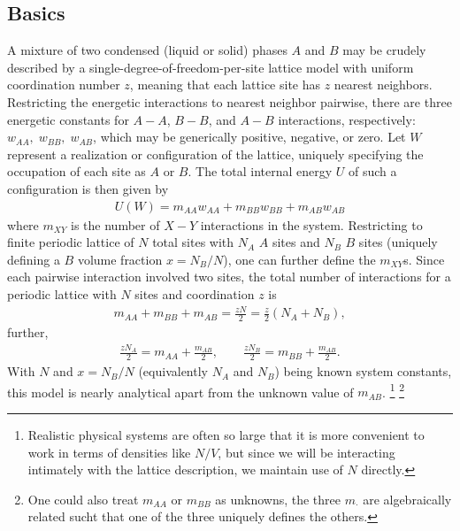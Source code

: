 \documentclass[10pt]{article}
\begin{document}
\subsection{Basics}
A mixture of two condensed (liquid or solid) phases $A$ and $B$ may be crudely described by a single-degree-of-freedom-per-site lattice model with uniform coordination number $z$, meaning that each lattice site has $z$ nearest neighbors.
Restricting the energetic interactions to nearest neighbor pairwise, there are three energetic constants for $A-A$, $B-B$, and $A-B$ interactions, respectively: $w_{AA}, \; w_{BB}, \; w_{AB}$, which may be generically positive, negative, or zero.
Let $W$ represent a realization or configuration of the lattice, uniquely specifying the occupation of each site as $A$ or $B$.
The total internal energy $U$ of such a configuration is then given by
\begin{align}
    U(W) = m_{AA} w_{AA} + m_{BB} w_{BB} + m_{AB} w_{AB}
\end{align}
where $m_{XY}$ is the number of $X-Y$ interactions in the system.
Restricting to finite periodic lattice of $N$ total sites with $N_A$ $A$ sites and $N_B$ $B$ sites (uniquely defining a $B$ volume fraction $x = N_B / N$), one can further define the $m_{XY}$s.
Since each pairwise interaction involved two sites, the total number of interactions for a periodic lattice with $N$ sites and coordination $z$ is
\begin{align}
    m_{AA} + m_{BB} + m_{AB} = \frac{z N}{2} = \frac{z}{2} \left( N_A + N_B \right),
\end{align}
further,
\begin{align}
    \frac{z N_A}{2} = m_{AA} + \frac{m_{AB}}{2}, \quad\quad
    \frac{z N_B}{2} = m_{BB} + \frac{m_{AB}}{2}.
\end{align}
With $N$ and $x=N_B/N$ (equivalently $N_A$ and $N_B$) being known system constants, this model is nearly analytical apart from the unknown value of $m_{AB}$. \footnote{Realistic physical systems are often so large that it is more convenient to work in terms of densities like $N/V$, but since we will be interacting intimately with the lattice description, we maintain use of $N$ directly.} \footnote{One could also treat $m_{AA}$ or $m_{BB}$ as unknowns, the three $m_{\cdot}$ are algebraically related sucht that one of the three uniquely defines the others.}
\end{document}
